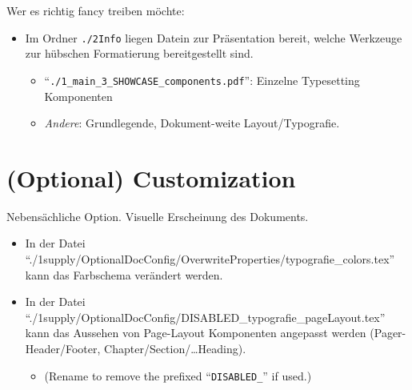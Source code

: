 Wer es richtig fancy treiben möchte:
\begin{itemize}[labsigA]
    \item Im Ordner \texttt{./\textcolor{RedOrange}{2Info}} liegen Datein zur Präsentation bereit, welche Werkzeuge zur hübschen Formatierung bereitgestellt sind.
        \begin{itemize}
            \item \enquote{\textcolor{PineGreen}{\texttt{./1\_main\_3\_SHOWCASE\_components.pdf}}}: Einzelne Typesetting Komponenten
            \item \textit{Andere}: Grundlegende, Dokument-weite Layout/Typografie.
        \end{itemize}
\end{itemize}




\section*{(Optional) Customization}
\noindent
Nebensächliche Option. Visuelle Erscheinung des Dokuments.
\begin{itemize}
	\item In der Datei \enquote{\textcolor{PineGreen}{./1supply/OptionalDocConfig/OverwriteProperties/typografie\_colors.tex}} kann das Farbschema verändert werden.
	\item In der Datei \enquote{\textcolor{PineGreen}{./1supply/OptionalDocConfig/DISABLED\_typografie\_pageLayout.tex}} kann das Aussehen von Page-Layout Komponenten angepasst werden (Pager-Header/Footer, Chapter/Section/\ldots Heading).
	\begin{itemize}
		\item (Rename to remove the prefixed \enquote{\texttt{DISABLED\_}} if used.)
	\end{itemize}
\end{itemize}



